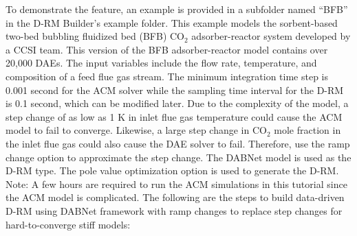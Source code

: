 To demonstrate the feature, an example is provided in a subfolder named ``BFB'' in the D-RM Builder's example folder.  This example models the sorbent-based two-bed bubbling fluidized bed (BFB) CO$_2$ adsorber-reactor system developed by a CCSI team.  This version of the BFB adsorber-reactor model contains over 20,000 DAEs.  The input variables include the flow rate, temperature, and composition of a feed flue gas stream.  The minimum integration time step is 0.001 second for the ACM solver while the sampling time interval for the D-RM is 0.1 second, which can be modified later.  Due to the complexity of the model, a step change of as low as 1 K in inlet flue gas temperature could cause the ACM model to fail to converge.  Likewise, a large step change in CO$_2$ mole fraction in the inlet flue gas could also cause the DAE solver to fail.  Therefore, use the ramp change option to approximate the step change.  The DABNet model is used as the D-RM type.  The pole value optimization option is used to generate the D-RM.  Note: A few hours are required to run the ACM simulations in this tutorial since the ACM model is complicated.  The following are the steps to build data-driven D-RM using DABNet framework with ramp changes to replace step changes for hard-to-converge stiff models:
